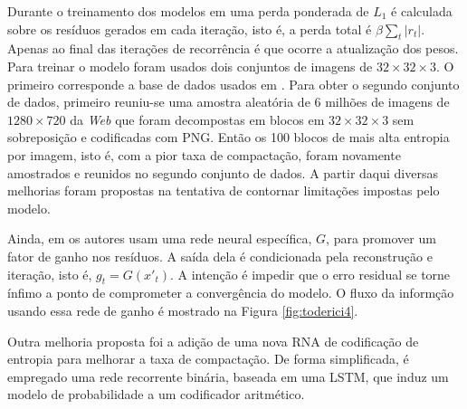 

Durante o treinamento dos modelos em \cite{FullResolution2017Toderici} uma perda ponderada de $L_1$ é calculada sobre os resíduos gerados em cada iteração, isto é, a perda total é $\beta \sum_t|r_t|$. Apenas ao final das iterações de recorrência é que ocorre a atualização dos pesos. 
Para treinar o modelo foram usados dois conjuntos de imagens de $32 \times 32 \times 3$. O primeiro corresponde a base de dados usados em \cite{Variable2016Toderici}.
Para obter o segundo conjunto de dados, primeiro reuniu-se uma amostra aleatória de 6 milhões de imagens de $1280 \times 720$ da \textit{Web} que foram decompostas em blocos em $32 \times 32 \times 3$ sem sobreposição  e codificadas com PNG. Então os 100 blocos de mais alta entropia por imagem, isto é, com a pior taxa de compactação, foram novamente amostrados e reunidos no segundo conjunto de dados. A partir daqui diversas melhorias foram propostas na tentativa de contornar limitações impostas pelo modelo. 

Ainda, em \cite{FullResolution2017Toderici} os autores usam uma rede neural específica, $G$,  para promover um fator de ganho nos resíduos. A saída dela é condicionada pela reconstrução e iteração, isto é, $g_t = G(x'_t)$. A intenção é impedir que o erro residual se torne ínfimo a ponto de comprometer a convergência do modelo. O fluxo da informção usando essa rede de ganho é mostrado na Figura \ref{fig:toderici4}.

Outra melhoria proposta foi a adição de uma nova RNA de codificação de entropia para melhorar a taxa de compactação. De forma simplificada, é empregado uma rede recorrente binária, baseada em uma LSTM, que induz um modelo de probabilidade a um codificador aritmético.








